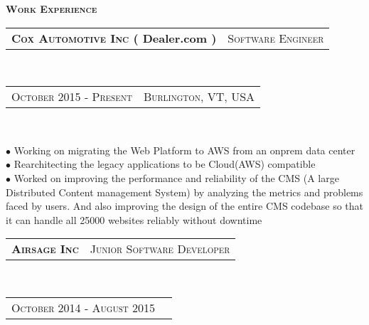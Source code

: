 \documentclass[10pt,a4paper,oneside]{article}
\begin{document}
    \begin{minipage}[t]{0.63\textwidth}
        \vspace{0pt}
        \textcolor{light-gray}{\textbf{\large W\textsc{ork} E\textsc{xperience}}}
        \vspace{10pt}\\
        \begin{tabular}{c|c}
            \textbf{\normalsize C\textsc{ox} A\textsc{utomotive} I\textsc{nc} ( Dealer.com )}
            &\textmd{\normalsize S\textsc{oftware} E\textsc{ngineer}}
        \end{tabular}\\
        \textcolor{light-gray}{
            \begin{tabular}{c|c}
                {\small O\textsc{ctober 2015} - P\textsc{resent}}
               &{\small B\textsc{urlington}, VT, USA}
            \end{tabular}
        }\\ 
        \vspace{-4mm}
        \begin{adjustwidth}{7pt}{0pt}
            {\footnotesize $\bullet$  Working on migrating the Web Platform to AWS from an onprem data center\\
            $\bullet$ Rearchitecting the legacy applications to be Cloud(AWS) compatible\\
        $\bullet$  Worked on improving the performance and reliability of the CMS (A large Distributed Content management System) by analyzing the metrics and problems faced by users. And also improving the design of the entire CMS codebase so that it can handle all 25000 websites reliably without downtime}\\
        \end{adjustwidth}
        \begin{tabular}{c|c}
            \textbf{\normalsize A\textsc{irsage} I\textsc{nc}}
            &\textmd{\normalsize J\textsc{unior} S\textsc{oftware} D\textsc{eveloper}}
        \end{tabular}\\
        \textcolor{light-gray}{
            \begin{tabular}{c|c}
                {\small O\textsc{ctober 2014} - A\textsc{ugust 2015}}

\end{tabular}}
\end{minipage}
\end{document}
